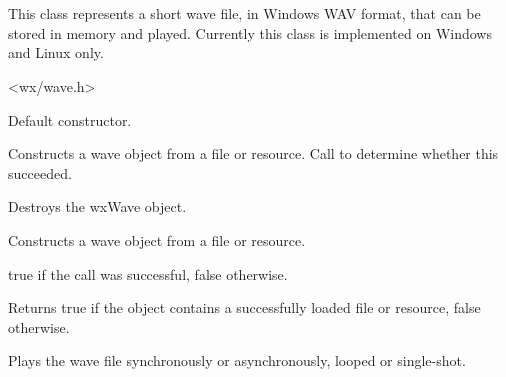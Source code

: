 \section{}\label{wxwave}

This class represents a short wave file, in Windows WAV format, that
can be stored in memory and played. Currently this class is implemented
on Windows and Linux only.




<wx/wave.h>


\label{wxwaveconstr}


Default constructor.


Constructs a wave object from a file or resource. Call  to
determine whether this succeeded.






Destroys the wxWave object.

\label{wxwavecreate}


Constructs a wave object from a file or resource.





true if the call was successful, false otherwise.

\label{wxwaveisok}


Returns true if the object contains a successfully loaded file or resource, false otherwise.

\label{wxwaveplay}


Plays the wave file synchronously or asynchronously, looped or single-shot.



